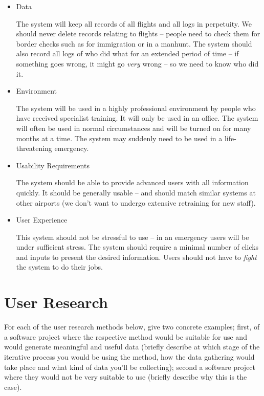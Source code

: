 \documentclass[10pt,\jkfside,a4paper]{article}
\begin{document}
\begin{enumerate}[label=(\alph*)]
\begin{itemize}
\item Data

The system will keep all records of all flights and all logs in perpetuity.
We should never delete records relating to flights -- people need to check them for border checks such as for
immigration or in a manhunt. The system should also record all logs of who did what for an extended period of time --
if something goes wrong, it might go \textit{very} wrong -- so we need to know who did it.

\item Environment

The system will be used in a highly professional environment by people who have received specialist training. It will
only be used in an office. The system will often be used in normal circumstances and will be turned on for many
months at a time. The system may suddenly need to be used in a life-threatening emergency.

\item Usability Requirements

The system should be able to provide advanced users with all information quickly. It should be generally usable --
and should match similar systems at other airports (we don't want to undergo extensive retraining for new staff).

\item User Experience

This system should not be stressful to use -- in an emergency users will be under sufficient stress. The system should
require a minimal number of clicks and inputs to present the desired information. Users should not have to
\textit{fight} the system to do their jobs.

\end{itemize}

\end{enumerate}

\section{User Research}

For each of the user research methods below, give two concrete examples;
first, of a software project where the respective method would be suitable for use and would generate meaningful and
useful data (briefly describe at which stage of the iterative process you would be using the
method, how the data gathering would take place and what kind of data you'll be collecting);
second a software project where they would not be very suitable to use (briefly describe
why this is the case).
\end{document}
